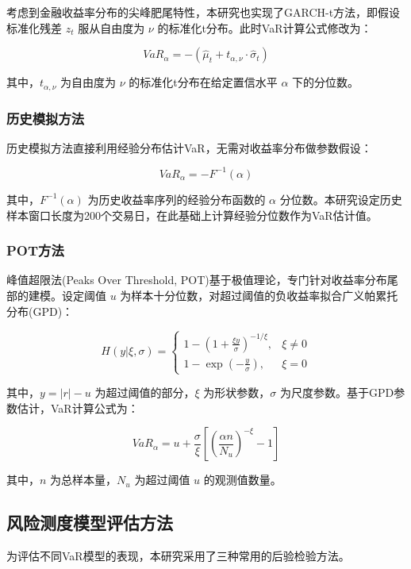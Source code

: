 \documentclass[12pt, a4paper]{article}
\begin{document}
考虑到金融收益率分布的尖峰肥尾特性，本研究也实现了GARCH-t方法，即假设标准化残差 $z_t$ 服从自由度为 $\nu$ 的标准化t分布。此时VaR计算公式修改为：

\begin{equation}
VaR_{\alpha} = -(\hat{\mu}_t + t_{\alpha,\nu} \cdot \hat{\sigma}_t)
\end{equation}

其中，$t_{\alpha,\nu}$ 为自由度为 $\nu$ 的标准化t分布在给定置信水平 $\alpha$ 下的分位数。

\subsubsection{历史模拟方法}
历史模拟方法直接利用经验分布估计VaR，无需对收益率分布做参数假设：

\begin{equation}
VaR_{\alpha} = -F^{-1}(\alpha)
\end{equation}

其中，$F^{-1}(\alpha)$ 为历史收益率序列的经验分布函数的 $\alpha$ 分位数。本研究设定历史样本窗口长度为200个交易日，在此基础上计算经验分位数作为VaR估计值。

\subsubsection{POT方法}
峰值超限法(Peaks Over Threshold, POT)基于极值理论，专门针对收益率分布尾部的建模。设定阈值 $u$ 为样本十分位数，对超过阈值的负收益率拟合广义帕累托分布(GPD)：

\begin{equation}
H(y|\xi,\sigma) = 
\begin{cases}
1 - \left(1 + \frac{\xi y}{\sigma}\right)^{-1/\xi}, & \xi \neq 0 \\
1 - \exp\left(-\frac{y}{\sigma}\right), & \xi = 0
\end{cases}
\end{equation}

其中，$y = |r| - u$ 为超过阈值的部分，$\xi$ 为形状参数，$\sigma$ 为尺度参数。基于GPD参数估计，VaR计算公式为：

\begin{equation}
VaR_{\alpha} = u + \frac{\sigma}{\xi} \left[ \left( \frac{\alpha n}{N_u} \right)^{-\xi} - 1 \right]
\end{equation}

其中，$n$ 为总样本量，$N_u$ 为超过阈值 $u$ 的观测值数量。

\subsection{风险测度模型评估方法}
为评估不同VaR模型的表现，本研究采用了三种常用的后验检验方法。
\end{document}
